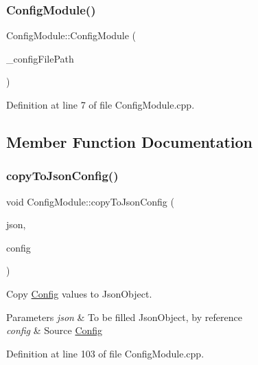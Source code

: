 \subsubsection{\texorpdfstring{ConfigModule()}{ConfigModule()}}
{\footnotesize\ttfamily Config\+Module\+::\+Config\+Module (\begin{DoxyParamCaption}\item[{String}]{\+\_\+config\+File\+Path }\end{DoxyParamCaption})}



Definition at line 7 of file Config\+Module.\+cpp.



\subsection{Member Function Documentation}
\mbox{\label{class_config_module_a19014d9b2ce8d8dee2333a52886d86d8}} 
\subsubsection{\texorpdfstring{copyToJsonConfig()}{copyToJsonConfig()}}
{\footnotesize\ttfamily void Config\+Module\+::copy\+To\+Json\+Config (\begin{DoxyParamCaption}\item[{Json\+Object \&}]{json,  }\item[{const \mbox{\hyperlink{struct_config}{Config}} \&}]{config }\end{DoxyParamCaption})\hspace{0.3cm}{\ttfamily [private]}}



Copy \mbox{\hyperlink{struct_config}{Config}} values to Json\+Object. 


\begin{DoxyParams}{Parameters}
{\em json} & To be filled Json\+Object, by reference \\
\hline
{\em config} & Source \mbox{\hyperlink{struct_config}{Config}} \\
\hline
\end{DoxyParams}


Definition at line 103 of file Config\+Module.\+cpp.

\mbox{\label{class_config_module_a1a9cda5559839cac0f4444d6352e9067}} 
